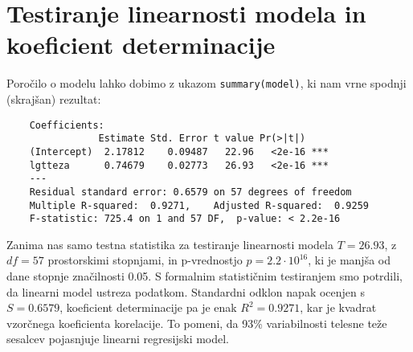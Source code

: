 \section{Testiranje linearnosti modela in koeficient determinacije}

Poročilo o modelu lahko dobimo z ukazom \verb|summary(model)|, ki nam vrne spodnji (skrajšan) rezultat:

\begin{verbatim}
    Coefficients:
                Estimate Std. Error t value Pr(>|t|)    
    (Intercept)  2.17812    0.09487   22.96   <2e-16 ***
    lgtteza      0.74679    0.02773   26.93   <2e-16 ***
    ---
    Residual standard error: 0.6579 on 57 degrees of freedom
    Multiple R-squared:  0.9271,    Adjusted R-squared:  0.9259
    F-statistic: 725.4 on 1 and 57 DF,  p-value: < 2.2e-16
\end{verbatim}

Zanima nas samo testna statistika za testiranje linearnosti modela $T = 26.93$, z $df = 57$ prostorskimi
stopnjami, in p-vrednostjo $p = 2.2 \cdot 10^{16}$, ki je manjša od dane stopnje značilnosti 0.05.
S formalnim statističnim testiranjem smo potrdili, da linearni model ustreza podatkom.
Standardni odklon napak ocenjen s $S = 0.6579$, koeficient determinacije pa je enak $R^{2} = 0.9271$, kar je kvadrat
vzorčnega koeficienta korelacije. To pomeni, da 93\% variabilnosti telesne teže sesalcev pojasnjuje linearni regresijski
model.